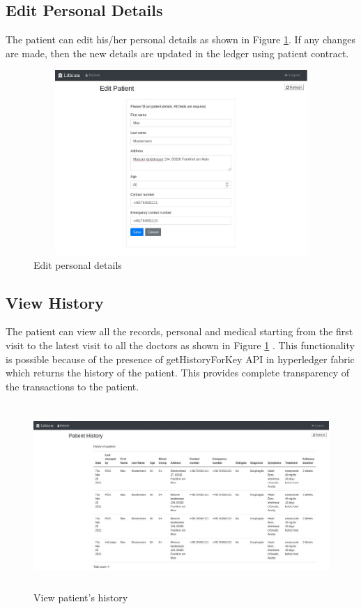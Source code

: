 \subsection{Edit Personal Details}
The patient can edit his/her personal details as shown in Figure \ref{fig:chapter04:patient5}. If any changes are made, then the new details are updated in the ledger using patient contract.

\begin{figure}[htbp]
 \centering
 \includegraphics[width=1.1\textwidth, height=7cm]{gfx/figures/patient5.jpg}
 \caption{Edit personal details}
 \label{fig:chapter04:patient5}
\end{figure}

\subsection{View History}
The patient can view all the records, personal and medical starting from the first visit to the latest visit to all the doctors as shown in Figure \ref{fig:chapter04:patient5} . This functionality is possible because of the presence of getHistoryForKey API in hyperledger fabric which returns the history of the patient. This provides complete transparency of the transactions to the patient.

\begin{figure}[htbp]
 \centering
 \includegraphics[width=1.1\textwidth, height=7cm]{gfx/figures/patient6.jpg}
 \caption{View patient's history}
 \label{fig:chapter04:patient6}
\end{figure}

